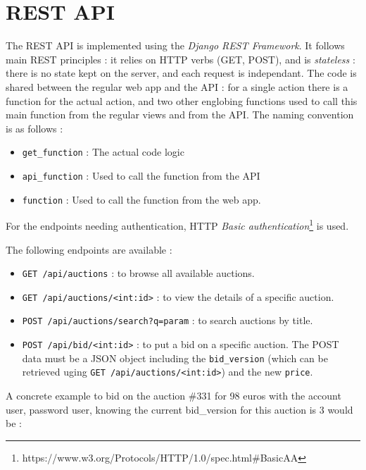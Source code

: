 \documentclass[a4paper, 11pt]{report}
\begin{document}
    \section{REST API}

    The REST API is implemented using the \textit{Django REST Framework}. It follows main REST principles : it relies on HTTP verbs (GET, POST), and is \textit{stateless} : there is no state kept on the server, and each request is independant. The code is shared between the regular web app and the API : for a single action there is a function for the actual action, and two other englobing functions used to call this main function from the regular views and from the API. The naming convention is as follows :

    \begin{itemize}
        \item \texttt{get\_function} : The actual code logic
        \item \texttt{api\_function} : Used to call the function from the API
        \item \texttt{function} : Used to call the function from the web app.
    \end{itemize}

    For the endpoints needing authentication, HTTP \textit{Basic authentication}\footnote{https://www.w3.org/Protocols/HTTP/1.0/spec.html\#BasicAA} is used. 

    The following endpoints are available : 

    \begin{itemize}
        \item \texttt{GET /api/auctions} : to browse all available auctions.
        \item \texttt{GET /api/auctions/<int:id>} : to view the details of a specific auction.
        \item \texttt{POST /api/auctions/search?q=param} : to search auctions by title. 
        \item \texttt{POST /api/bid/<int:id>} : to put a bid on a specific auction. The POST data must be a JSON object including the \texttt{bid\_version} (which can be retrieved uging \texttt{GET /api/auctions/<int:id>}) and the new \texttt{price}. 
    \end{itemize}

    A concrete example to bid on the auction \#331 for 98 euros with the account user, password user, knowing the current bid\_version for this auction is 3 would be :
\end{document}

